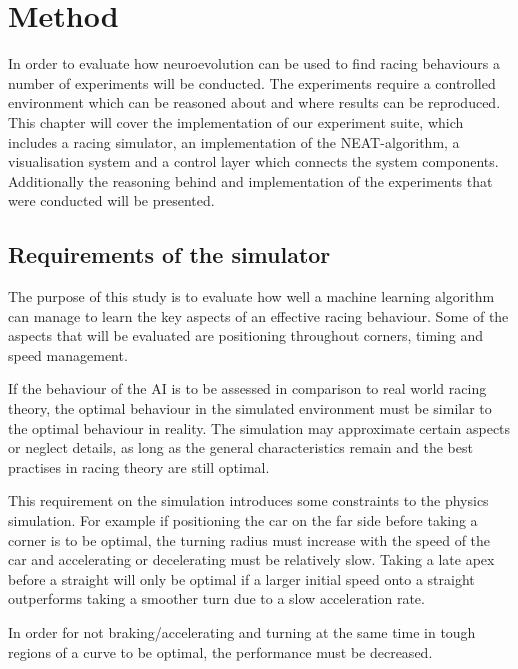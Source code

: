 
\chapter{Method}

In order to evaluate how neuroevolution can be used to find racing behaviours a number of experiments will be conducted. The experiments require a controlled environment which can be reasoned about and where results can be reproduced. This chapter will cover the implementation of our experiment suite, which includes a racing simulator, an implementation of the NEAT-algorithm, a visualisation system and a control layer which connects the system components. Additionally the reasoning behind and implementation of the experiments that were conducted will be presented. 

\section{Requirements of the simulator}


The purpose of this study is to evaluate how well a machine learning algorithm can manage to learn the key aspects of an effective racing behaviour. Some of the aspects that will be evaluated are positioning throughout corners, timing and speed management. 

If the behaviour of the AI is to be assessed in comparison to real world racing theory, the optimal behaviour in the simulated environment must be similar to the optimal behaviour in reality. The simulation may approximate certain aspects or neglect details, as long as the general characteristics remain and the best practises in racing theory are still optimal. %

This requirement on the simulation introduces some constraints to the physics simulation. For example if positioning the car on the far side before taking a corner is to be optimal, the turning radius must increase with the speed of the car and accelerating or decelerating must be relatively slow. Taking a late apex before a straight will only be optimal if a larger initial speed onto a straight outperforms taking a smoother turn due to a slow acceleration rate. 

In order for not braking/accelerating and turning at the same time in tough regions of a curve to be optimal, the performance must be decreased.


